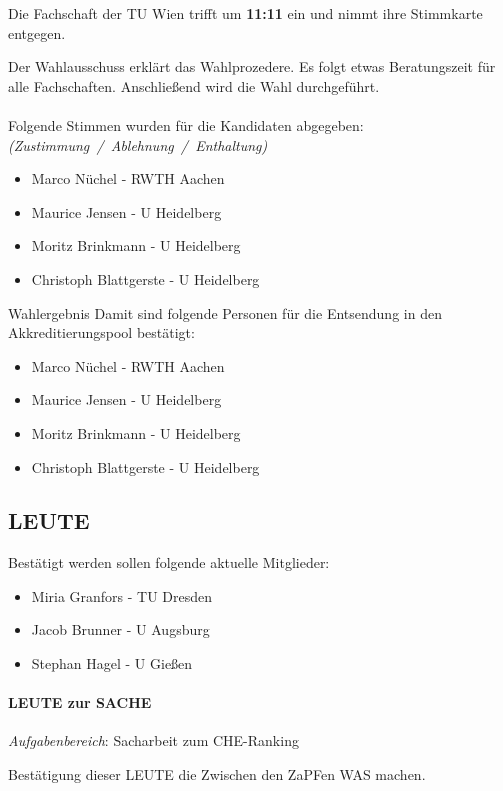     \begin{info}{}
      Die Fachschaft der TU Wien trifft um \textbf{11:11} ein und nimmt ihre Stimmkarte entgegen.
    \end{info}

    Der Wahlausschuss erklärt das Wahlprozedere.
    Es folgt etwas Beratungszeit für alle Fachschaften. Anschließend wird die Wahl durchgeführt. \\ \\

    Folgende Stimmen wurden für die Kandidaten abgegeben: \textit{(Zustimmung~/~Ablehnung~/~Enthaltung)}
    \begin{itemize}
      \item Marco Nüchel - RWTH Aachen
      \item Maurice Jensen - U Heidelberg
      \item Moritz Brinkmann - U Heidelberg
      \item Christoph Blattgerste - U Heidelberg
    \end{itemize}

    \begin{success}{Wahlergebnis}
      Damit sind folgende Personen für die Entsendung in den Akkreditierungspool bestätigt:
      \begin{itemize}
        \item Marco Nüchel - RWTH Aachen
        \item Maurice Jensen - U Heidelberg
        \item Moritz Brinkmann - U Heidelberg
        \item Christoph Blattgerste - U Heidelberg
      \end{itemize}
    \end{success}

  \subsection{LEUTE}
      Bestätigt werden sollen folgende aktuelle Mitglieder:
      \begin{itemize}
        \item Miria Granfors - TU Dresden
        \item Jacob Brunner - U Augsburg
        \item Stephan Hagel - U Gießen
      \end{itemize}
    \paragraph{LEUTE zur SACHE}
      \textit{Aufgabenbereich}: Sacharbeit zum CHE-Ranking
      \begin{success}{}
        Bestätigung dieser LEUTE die Zwischen den ZaPFen WAS machen.
      \end{success}

